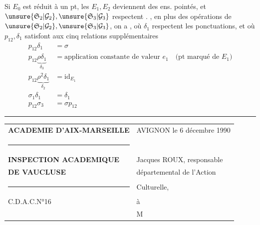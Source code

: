 Si $E_0$ est réduit à un pt, les $E_1,E_2$ deviennent des ens. pointés, et $\unsure{\mathfrak S_2|\mathcal G_2},\unsure{\mathfrak S_3|\mathcal G_3}$ respectent .
, en plus des opérations de $\unsure{\mathfrak S_2|\mathcal G_2},\unsure{\mathfrak S_3|\mathcal G_3}$, on a
, où $\delta_1$  respectent les ponctuations, et où $p_{12},\delta_1$ satisfont aux cinq relations supplémentaires
\[\boxed{\begin{aligned}
p_{12}\delta_1&=\sigma\\
p_{12}\underbrace{\rho\delta_1}_{\delta_3}&=\text{application constante de valeur }e_1\quad\text{(pt marqué de }E_1\text{)}\\
p_{12}\underbrace{\rho^2\delta_1}_{\delta_2}&=\mathrm{id}_{E_1}\\
\sigma_1\delta_1&=\delta_1\\
p_{12}\sigma_3&=\sigma p_{12}
\end{aligned}}\]

\hrule
\begin{tabular}{p{.47\linewidth}p{.47\linewidth}}
\textbf{ACADEMIE D'AIX-MARSEILLE} & AVIGNON le 6 décembre 1990\\
\rule{3cm}{.4pt}&\\
\textbf{INSPECTION ACADEMIQUE} & Jacques ROUX, responsable\\
\textbf{DE VAUCLUSE}&départemental de l'Action\\
\rule{1cm}{.4pt}&Culturelle,\\[1em]
C.D.A.C.N°16&à\\[1em]
&M
\end{tabular}

